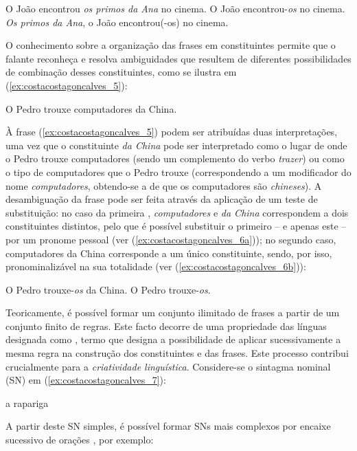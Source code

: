\documentclass[output=paper]{LSP/langsci}
\begin{document}
\ea\label{ex:costacostagoncalves_3}
\ea\label{ex:costacostagoncalves_3a} O João encontrou \textit{os primos da Ana} no cinema.
\ex\label{ex:costacostagoncalves_3b} O João encontrou-\textit{os} no cinema.
\ex\label{ex:costacostagoncalves_3c} \textit{Os primos da Ana}, o João encontrou(-os) no cinema.
\zl

O conhecimento sobre a organização das frases em constituintes permite que o falante reconheça e resolva ambiguidades que resultem de diferentes possibilidades de combinação desses constituintes, como se ilustra em (\ref{ex:costacostagoncalves_5}):

\ea\label{ex:costacostagoncalves_5}O Pedro trouxe computadores da China.\z


À frase (\ref{ex:costacostagoncalves_5}) podem ser atribuídas duas interpretações, uma vez que o constituinte \textit{da China} pode ser interpretado como o lugar de onde o Pedro trouxe computadores (sendo um complemento do verbo \textit{trazer}) ou como o tipo de computadores que o Pedro trouxe (correspondendo a um modificador do nome \textit{computadores}, obtendo-se a  de que os computadores são \textit{chineses}). A desambiguação da frase pode ser feita através da aplicação de um teste de substituição: no caso da primeira , \textit{computadores} e \textit{da China} correspondem a dois constituintes distintos, pelo que é possível substituir o primeiro – e apenas este – por um pronome pessoal (ver (\ref{ex:costacostagoncalves_6a})); no segundo caso, computadores da China corresponde a um único constituinte, sendo, por isso, pronominalizável na sua totalidade (ver (\ref{ex:costacostagoncalves_6b})):

\ea\label{ex:costacostagoncalves_6}
\ea\label{ex:costacostagoncalves_6a} O Pedro trouxe-\textit{os} da China.
\ex\label{ex:costacostagoncalves_6b} O Pedro trouxe-\textit{os}.
\zl

Teoricamente, é possível formar um conjunto ilimitado de frases a partir de um conjunto finito de regras. Este facto decorre de uma propriedade das línguas designada como \textit{}, termo que designa a possibilidade de aplicar sucessivamente a mesma regra na construção dos constituintes e das frases. Este processo contribui crucialmente para a \textit{criatividade linguística}. Considere-se o sintagma nominal (SN) em (\ref{ex:costacostagoncalves_7}):

\ea\label{ex:costacostagoncalves_7} a rapariga\z

A partir deste SN simples, é possível formar SNs mais complexos por encaixe sucessivo de orações , por exemplo:
\end{document}
